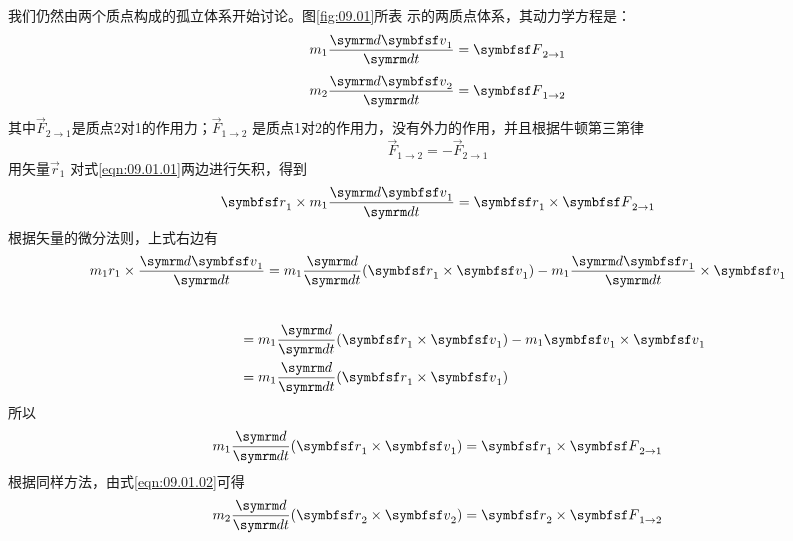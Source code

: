 我们仍然由两个质点构成的孤立体系开始讨论。图\ref{fig:09.01}所表
示的两质点体系，其动力学方程是：
\begin{equation}\label{eqn:09.01.01}
  m _ { 1 } \frac { \dif \vec{v} _ { 1 } } { \dif t } = \vec{F} _ { 2 \to 1 }
\end{equation}
\begin{equation}\label{eqn:09.01.02}
  m _ { 2 } \frac { \dif \vec{v} _ { 2 } } { \dif t } = \vec{F} _ { 1 \to 2 }
\end{equation}
其中$\vec{F} _ { 2 \to 1 }$是质点2对1的作用力；$\vec{F} _ { 1 \to 2 }$
是质点1对2的作用力，没有外力的作用，并且根据牛顿第三第律
\begin{equation}\label{eqn:09.01.03}
  \vec{F} _ { 1 \to 2 } = - \vec{F} _ { 2 \to 1 }
\end{equation}
用矢量$\vec{r} _ { 1 }$ 对式\eqref{eqn:09.01.01}两边进行矢积，得到
\begin{equation*}
  \vec{r} _ { 1 } \times m _ { 1 } \frac { \dif \vec{v} _ { 1 } } { \dif t } = \vec{r} _ { 1 } \times \vec{F} _ { 2 \to 1 }
\end{equation*}
根据矢量的微分法则，上式右边有
\begin{equation*}
  m _ 1 r _ { 1 } \times \frac { \dif \vec{v}_ { 1 } } { \dif t } = m _ { 1 } \frac { \dif } { \dif t } ( \vec{r} _ { 1 } \times \vec{v} _ { 1 }) - m _ { 1 } \frac { \dif \vec{r} _ { 1 } } { \dif t} \times \vec{v} _ { 1 }
\end{equation*}
\clearpage\mbox{}~\vspace{-2em}
\begin{equation*}
  \begin{aligned}
    \hspace{5em} & = m _ { 1 } \frac { \dif } { \dif t } ( \vec{r} _ { 1 } \times \vec{v} _ { 1 } ) - m _ { 1 } \vec{v} _ { 1 } \times \vec{v} _ { 1 } \\
                 & = m _ { 1 } \frac { \dif } { \dif t } ( \vec{r} _ { 1 } \times \vec{v} _ { 1 } )
  \end{aligned}
\end{equation*}
所以
\begin{equation}\label{eqn:09.01.04}
  m _{ 1 } \frac { \dif }{\dif t } ( \vec{r} _ { 1 } \times \vec{v} _ { 1 } ) = \vec{r} _ { 1 } \times \vec{F} _ { 2 \to 1 }
\end{equation}
根据同样方法，由式\eqref{eqn:09.01.02}可得
\begin{equation}\label{eqn:09.01.05}
  m _{ 2 } \frac { \dif }{\dif t } ( \vec{r} _ { 2 } \times \vec{v} _ { 2 } ) = \vec{r} _ { 2 } \times \vec{F} _ { 1 \to 2 }
\end{equation}
